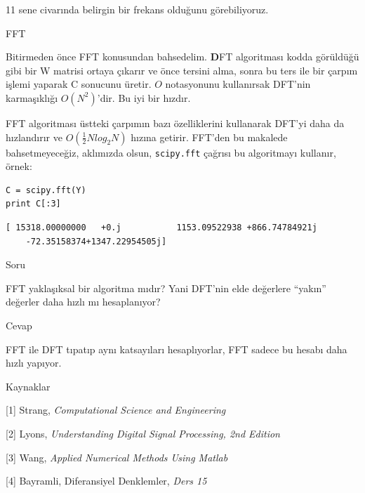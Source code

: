\documentclass[12pt,fleqn]{article}\usepackage{../../common}
\begin{document}
11 sene civarında belirgin bir frekans olduğunu görebiliyoruz. 

FFT

Bitirmeden önce FFT konusundan bahsedelim. $\textbf{D}$FT algoritması kodda
görüldüğü gibi bir W matrisi ortaya çıkarır ve önce tersini alma, sonra bu ters
ile bir çarpım işlemi yaparak C sonucunu üretir. $O$ notasyonunu kullanırsak
DFT'nin karmaşıklığı $O(N^2)$'dir. Bu iyi bir hızdır.

FFT algoritması üstteki çarpımın bazı özelliklerini kullanarak DFT'yi daha
da hızlandırır ve $O(\frac{1}{2}Nlog_2N)$ hızına getirir. FFT'den bu
makalede bahsetmeyeceğiz, aklımızda olsun, \verb!scipy.fft! çağrısı bu
algoritmayı kullanır, örnek:

\begin{verbatim}
C = scipy.fft(Y)
print C[:3]
\end{verbatim}

\begin{verbatim}
[ 15318.00000000   +0.j           1153.09522938 +866.74784921j
    -72.35158374+1347.22954505j]
\end{verbatim}

Soru

FFT yaklaşıksal bir algoritma mıdır? Yani DFT'nin elde değerlere ``yakın''
değerler daha hızlı mı hesaplanıyor? 

Cevap

FFT ile DFT tıpatıp aynı katsayıları hesaplıyorlar, FFT sadece bu hesabı
daha hızlı yapıyor.


Kaynaklar

[1] Strang, {\em Computational Science and Engineering}

[2] Lyons, {\em Understanding Digital Signal Processing, 2nd Edition}

[3] Wang, {\em Applied Numerical Methods Using Matlab}

[4] Bayramli, Diferansiyel Denklemler, {\em Ders 15}
\end{document}
